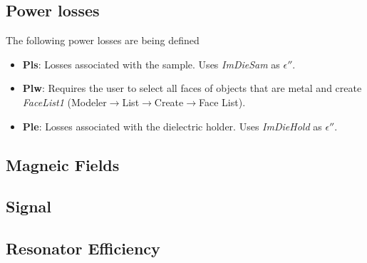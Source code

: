 \subsection*{Power losses}
The following power losses are being defined
\begin{itemize}
    \item \textbf{Pls}: Losses associated with the sample. Uses \textit{ImDieSam} as $\epsilon''$.
    \item \textbf{Plw}: Requires the user to select all faces of objects that are metal and create \textit{FaceList1} (Modeler$\xrightarrow{}$List$\xrightarrow{}$Create$\xrightarrow{}$Face List).
    \item \textbf{Ple}: Losses associated with the dielectric holder. Uses \textit{ImDieHold} as $\epsilon''$.
\end{itemize}{}

\newpage

\subsection*{Magneic Fields}

\newpage


\subsection*{Signal}

\newpage

\subsection*{Resonator Efficiency}
